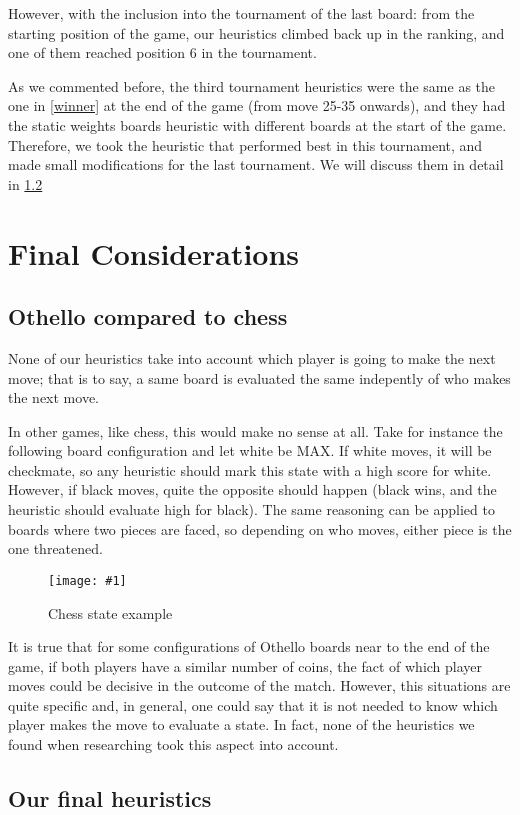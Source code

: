 \documentclass{article}
\newcommand{\myFigure}[4]{%
    \begin{figure}[H]
        \texttt{[image: \#1]}
        \centering
        \caption{#2}
        \label{#3}
    \end{figure}
}
\begin{document}
However, with the inclusion into the tournament of the last board: from the starting position of the game, our heuristics climbed back up in the ranking, and one of them reached position 6 in the tournament.

As we commented before, the third tournament heuristics were the same as the one in \ref{winner} at the end of the game (from move 25-35 onwards), and they had the static weights boards heuristic with different boards at the start of the game. Therefore, we took the heuristic that performed best in this tournament, and made small modifications for the last tournament. We will discuss them in detail in \ref{final_heuristics}

\section{Final Considerations}

\subsection{Othello compared to chess}

None of our heuristics take into account which player is going to make the next move; that is to say, a same board is evaluated the same indepently of who makes the next move. 

In other games, like chess, this would make no sense at all. Take for instance the following board configuration and let white be MAX. If white moves, it will be checkmate, so any heuristic should mark this state with a high score for white. However, if black moves, quite the opposite should happen (black wins, and the heuristic should evaluate high for black). The same reasoning can be applied to boards where two pieces are faced, so depending on who moves, either piece is the one threatened.

\myFigure{./images/tablero1.png}{Chess state example}{tablero1}{0.4}

It is true that for some configurations of Othello boards near to the end of the game, if both players have a similar number of coins, the fact of which player moves could be decisive in the outcome of the match. However, this situations are quite specific and, in general, one could say that it is not needed to know which player makes the move to evaluate a state. In fact, none of the heuristics we found when researching took this aspect into account.


\subsection{Our final heuristics}\label{final_heuristics}
\end{document}
